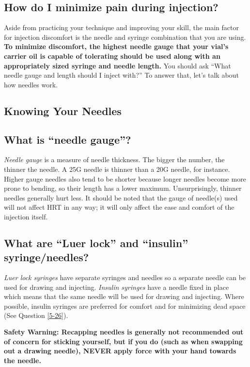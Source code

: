 \documentclass{article}
\begin{document}
\subsection{How do I minimize pain during injection?}

Aside from practicing your technique and improving your skill, the main factor for injection discomfort is the needle and syringe combination that you are using. \textbf{To minimize discomfort, the highest needle gauge that your vial’s carrier oil is capable of tolerating should be used along with an appropriately sized syringe and needle length. }You should ask “What needle gauge and length should I inject with?” To answer that, let’s talk about how needles work.

\subsection*{Knowing Your Needles}

\subsection{What is “needle gauge”?}

\textit{Needle gauge }is a measure of needle thickness. The bigger the number, the thinner the needle. A 25G needle is thinner than a 20G needle, for instance. Higher gauge needles also tend to be shorter because longer needles become more prone to bending, so their length has a lower maximum. Unsurprisingly, thinner needles generally hurt less. It should be noted that the gauge of needle(s) used will not affect HRT in any way; it will only affect the ease and comfort of the injection itself.

\subsection{What are “Luer lock” and “insulin” syringe/needles?}\label{5-13}

\textit{Luer lock syringes} have separate syringes and needles so a separate needle can be used for drawing and injecting. \textit{Insulin syringes} have a needle fixed in place which means that the same needle will be used for drawing and injecting. Where possible, insulin syringes are preferred for comfort and for minimizing dead space (See Question \ref{5-26}).

\textbf{Safety Warning: Recapping needles is generally not recommended out of concern for sticking yourself, but if you do (such as when swapping out a drawing needle), NEVER apply force with your hand towards the needle.}
\end{document}
